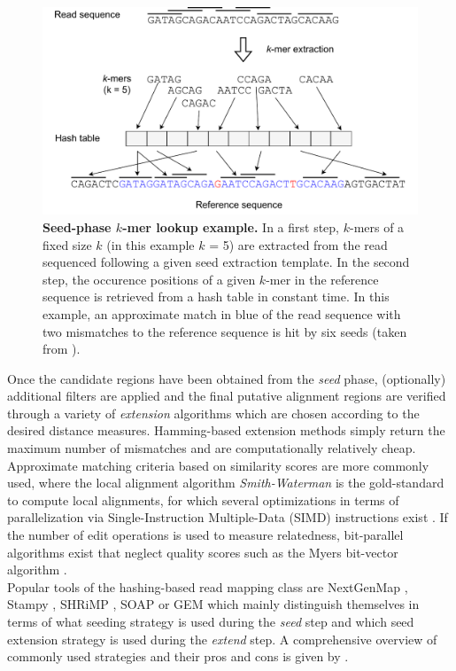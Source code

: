 \begin{figure}[h]
	 \centering
	 \includegraphics[width=0.85\linewidth]{img/chapter1/seedphase}
	  \caption[Seed-phase $k$-mer lookup example]{\textbf{Seed-phase $k$-mer lookup example.} In a first step, $k$-mers of a fixed size $k$ (in this example $k$ = 5) are extracted from the read sequenced following a given seed extraction template. In the second step, the occurence positions of a given $k$-mer in the reference sequence is retrieved from a hash table in constant time. In this example, an approximate match in blue of the read sequence with two mismatches to the reference sequence is hit by six seeds (taken from \citeauthor{Canzar2015} \citep{Canzar2015}).}
	 \label{fig:seedphase}
\end{figure}

Once the candidate regions have been obtained from the \textit{seed} phase, (optionally) additional filters are applied and the final putative alignment regions are verified through a variety of \textit{extension} algorithms which are chosen according to the desired distance measures. Hamming-based extension methods simply return the maximum number of mismatches and are computationally relatively cheap. Approximate matching criteria based on similarity scores are more commonly used, where the local alignment algorithm \textit{Smith-Waterman} is the gold-standard to compute local alignments, for which several optimizations in terms of parallelization via Single-Instruction Multiple-Data (SIMD) instructions exist \citep{Rescheneder2012MASon:Data}. If the number of edit operations is used to measure relatedness, bit-parallel algorithms exist that neglect quality scores such as the Myers bit-vector algorithm \citep{10.1145/316542.316550}. \\
Popular tools of the hashing-based read mapping class are NextGenMap \citep{Sedlazeck2013}, Stampy \citep{Lunter2011Stampy:Reads}, SHRiMP \citep{Rumble2009}, SOAP \citep{Li2008} or GEM \citep{MarcoSola2012} which mainly distinguish themselves in terms of what seeding strategy is used during the \textit{seed} step and which seed extension strategy is used during the \textit{extend} step. A comprehensive overview of commonly used strategies and their pros and cons is given by \citeauthor{Canzar2015} \citep{Canzar2015}.

